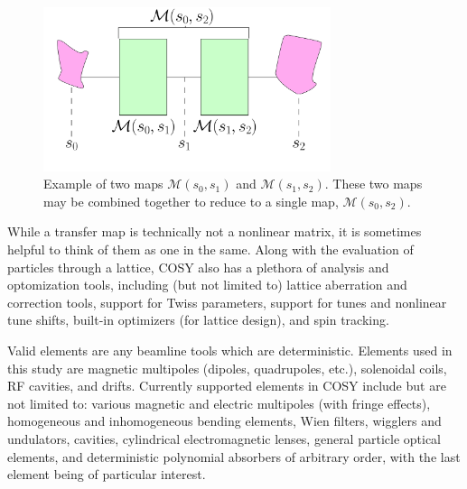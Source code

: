 \begin{figure}[h!]
  \centering
    \includegraphics[width=0.75\textwidth]{Figures/matrix_element_example_2} 
  \caption{Example of two maps $\mathcal{M}(s_0,s_1)$ and $\mathcal{M}(s_1,s_2)$. These two maps may be combined together to reduce to a single map, $\mathcal{M}(s_0,s_2)$.}
  \label{fig:matrix_element_example_2}
\end{figure}

While a transfer map is technically not a nonlinear matrix, it is sometimes helpful to think of them as one in the same. Along with the evaluation of particles through a lattice, COSY also has a plethora of analysis and optomization tools, including (but not limited to) lattice aberration and correction tools, support for Twiss parameters, support for tunes and nonlinear tune shifts, built-in optimizers (for lattice design), and spin tracking.

Valid elements are any beamline tools which are deterministic. Elements used in this study are magnetic multipoles (dipoles, quadrupoles, etc.), solenoidal coils, RF cavities, and drifts. Currently supported elements in COSY include but are not limited to: various magnetic and electric multipoles (with fringe effects), homogeneous and inhomogeneous bending elements, Wien filters, wigglers and undulators, cavities, cylindrical electromagnetic lenses, general particle optical elements, and deterministic polynomial absorbers of arbitrary order, with the last element being of particular interest.



